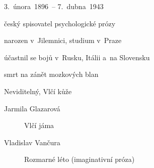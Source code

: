 {\parag{\getauthor}
\begin{compactitem}
	\item 3.~února~1896~-- 7.~dubna~1943
	\item český spisovatel psychologické prózy
	\item narozen v~Jilemnici, studium v~Praze
	\item účastnil se bojů v~Rusku, Itálii a~na Slovensku
	\item smrt na zánět mozkových blan
	\item Neviditelný, Vlčí kůže
\end{compactitem}

\begin{description}
	\item[Jarmila Glazarová] Vlčí jáma
	\item[Vladislav Vančura] Rozmarné léto (imaginativní próza)
\end{description}
}
